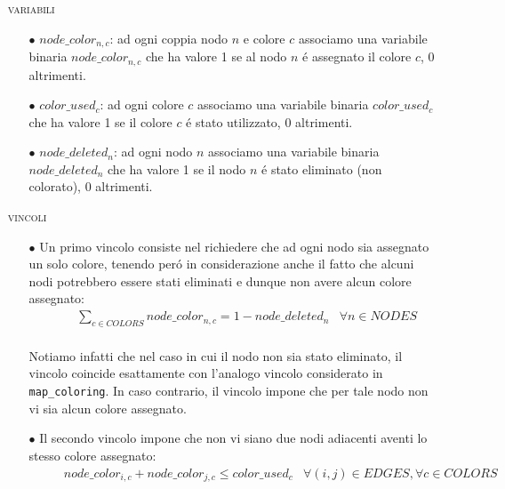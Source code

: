 \documentclass{article}
\begin{document}
\begin{itemize}
\item[] \textsc{variabili}
	\begin{itemize}
	\item[$\bullet$] $node\_color_{n,c}$: ad ogni coppia nodo $n$ e colore $c$ associamo una variabile binaria $node\_color_{n,c}$ che ha valore 1 se al nodo $n$ \'e assegnato il colore $c$, 0 altrimenti.\\
	\item[$\bullet$] $color\_used_{c}$: ad ogni colore $c$ associamo una variabile binaria $color\_used_{c}$ che ha valore 1 se il colore $c$ \'e stato utilizzato, 0 altrimenti.\\
	\item[$\bullet$] $node\_deleted_{n}$: ad ogni nodo $n$ associamo una variabile binaria $node\_deleted_{n}$ che ha valore 1 se il nodo $n$ \'e stato eliminato (non colorato), 0 altrimenti.\\
	\end{itemize}
	
\item[] \textsc{vincoli}
	\begin{itemize}
	\item[$\bullet$] Un primo vincolo consiste nel richiedere che ad ogni nodo sia assegnato un solo colore, tenendo per\'o in considerazione anche il fatto che alcuni nodi potrebbero essere stati eliminati e dunque non avere alcun colore assegnato:\\
	\begin{equation*}
	\begin{aligned}
	& & &  \sum\limits_{c \in COLORS} node\_color_{n,c} = 1 - node\_deleted_{n} & \forall n \in NODES\\ 
	\end{aligned}
	\end{equation*}
	
	Notiamo infatti che nel caso in cui il nodo non sia stato eliminato, il vincolo coincide esattamente con l'analogo vincolo considerato in \texttt{map\_coloring}. In caso contrario, il vincolo impone che per tale nodo non vi sia alcun colore assegnato.\\
	
	\item[$\bullet$] Il secondo vincolo impone che non vi siano due nodi adiacenti aventi lo stesso colore assegnato:\\
	\begin{equation*}
	\begin{aligned}
	& & &  node\_color_{i,c} + node\_color_{j,c} \le color\_used_{c} & \forall (i,j) \in EDGES, \forall c \in COLORS\\
	

\end{aligned}
\end{equation*}
\end{itemize}
\end{itemize}
\end{document}
